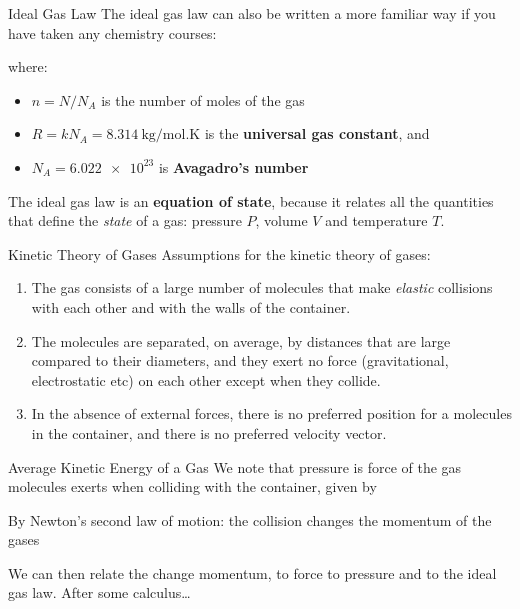 \documentclass[12pt,aspectratio=169]{beamer}
\newcommand{\mb}[1]{\mathbf{#1}}
\newcommand{\eq}[2]{\vspace{#1}{\Large\begin{displaymath}#2\end{displaymath}}}
\begin{document}
\begin{frame}{Ideal Gas Law}
  The ideal gas law can also be written a more familiar way if you have taken
  any chemistry courses:
  
  \eq{-.25in}{
    \boxed{PV=nRT}
  }

  \vspace{-.2in}where:
  \begin{itemize}
  \item $n=N/N_A$ is the number of moles of the gas
  \item $R=kN_A=\SI{8.314}{\kilo\gram/\mol.\kelvin}$ is the
    \textbf{universal gas constant}, and
  \item $N_A=\num{6.022e23}$ is \textbf{Avagadro's number}
  \end{itemize}

  \vspace{.1in}The ideal gas law is an \textbf{equation of state}, because it
  relates all the quantities that define the \emph{state} of a gas: pressure
  $P$, volume $V$ and temperature $T$.
\end{frame}



\begin{frame}{Kinetic Theory of Gases}
  Assumptions for the kinetic theory of gases:
  \begin{enumerate}
  \item The gas consists of a large number of molecules that make
    \emph{elastic} collisions with each other and with the walls of the
    container.
  \item The molecules are separated, on average, by distances that are large
    compared to their diameters, and they exert no force (gravitational,
    electrostatic etc) on each other except when they collide.\footnotemark
  \item In the absence of external forces, there is no preferred position for a
    molecules in the container, and there is no preferred velocity vector.
  \end{enumerate}

\end{frame}



\begin{frame}{Average Kinetic Energy of a Gas}
  We note that pressure is force of the gas molecules exerts when colliding
  with the container, given by

  \eq{-.3in}{ P=\frac{F}{A} }

  By Newton's second law of motion: the collision changes the momentum of the
  gases

  \eq{-.3in}{ \mb{F}=\frac{d\mb{p}}{dt} }

  We can then relate the change momentum, to force to pressure and to the ideal
  gas law. After some calculus\ldots
\end{frame}
\end{document}
